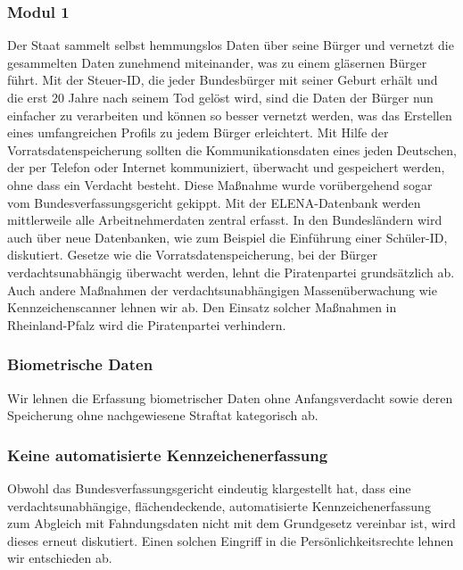\subsubsection{Modul 1}
\abstimmung
Der Staat sammelt selbst hemmungslos Daten über seine Bürger und vernetzt die gesammelten Daten zunehmend miteinander, was zu einem gläsernen Bürger führt. Mit der Steuer-ID, die jeder Bundesbürger mit seiner Geburt erhält und die erst 20 Jahre nach seinem Tod gelöst wird, sind die Daten der Bürger nun einfacher zu verarbeiten und können so besser vernetzt werden, was das Erstellen eines umfangreichen Profils zu jedem Bürger erleichtert. Mit Hilfe der Vorratsdatenspeicherung sollten die Kommunikationsdaten eines jeden Deutschen, der per Telefon oder Internet kommuniziert, überwacht und gespeichert werden, ohne dass ein Verdacht besteht. Diese Maßnahme wurde vorübergehend sogar vom Bundesverfassungsgericht gekippt. Mit der ELENA-Datenbank werden mittlerweile alle Arbeitnehmerdaten zentral erfasst. In den Bundesländern wird auch über neue Datenbanken, wie zum Beispiel die Einführung einer Schüler-ID, diskutiert. Gesetze wie die Vorratsdatenspeicherung, bei der Bürger verdachtsunabhängig überwacht werden, lehnt die Piratenpartei grundsätzlich ab. Auch andere Maßnahmen der verdachtsunabhängigen Massenüberwachung wie Kennzeichenscanner lehnen wir ab. Den Einsatz solcher Maßnahmen in Rheinland-Pfalz wird die Piratenpartei verhindern.
 
\subsubsection{Biometrische Daten}
\abstimmung
Wir lehnen die Erfassung biometrischer Daten ohne Anfangsverdacht sowie deren Speicherung ohne nachgewiesene Straftat kategorisch ab.

\subsubsection{Keine automatisierte Kennzeichenerfassung}
\abstimmung
Obwohl das Bundesverfassungsgericht eindeutig klargestellt hat, dass eine verdachtsunabhängige, flächendeckende, automatisierte Kennzeichenerfassung zum Abgleich mit Fahndungsdaten nicht mit dem Grundgesetz vereinbar ist, wird dieses erneut diskutiert. Einen solchen Eingriff in die Persönlichkeitsrechte lehnen wir entschieden ab.

